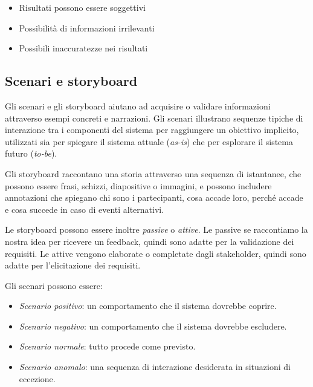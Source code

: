 \begin{tcolorbox}[colback=red!5!white,colframe=red!75!black, title=Contro del card sorting e repertory grids]
    \begin{itemize}
        \item Risultati possono essere soggettivi
        \item Possibilità di informazioni irrilevanti
        \item Possibili inaccuratezze nei risultati
    \end{itemize}
\end{tcolorbox}

\subsection{Scenari e storyboard}

Gli scenari e gli storyboard aiutano ad acquisire o validare informazioni
attraverso esempi concreti e narrazioni. Gli scenari illustrano sequenze
tipiche di interazione tra i componenti del sistema per raggiungere un
obiettivo implicito, utilizzati sia per spiegare il sistema attuale
(\textit{as-is}) che per esplorare il sistema futuro (\textit{to-be}).

Gli storyboard raccontano una storia attraverso una sequenza di istantanee,
che possono essere frasi, schizzi, diapositive o immagini, e possono includere
annotazioni che spiegano chi sono i partecipanti, cosa accade loro, perché
accade e cosa succede in caso di eventi alternativi.

Le storyboard possono essere inoltre \textit{passive} o \textit{attive}. Le 
passive se raccontiamo la nostra idea per ricevere un feedback, quindi sono 
adatte per la validazione dei requisiti. Le attive vengono elaborate o 
completate dagli stakeholder, quindi sono adatte per l'elicitazione dei
requisiti.

Gli scenari possono essere:

\begin{itemize}
    \item \textit{Scenario positivo}: un comportamento che il sistema dovrebbe
    coprire.
    \item \textit{Scenario negativo}: un comportamento che il sistema dovrebbe
    escludere.
    \item \textit{Scenario normale}: tutto procede come previsto.
    \item \textit{Scenario anomalo}: una sequenza di interazione desiderata in
    situazioni di eccezione.
\end{itemize}

